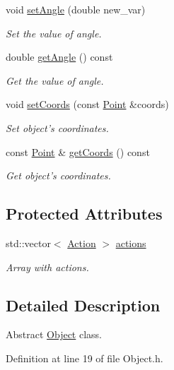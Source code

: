 \begin{DoxyCompactItemize}
void \hyperlink{classObject_a075891336e08ea144917d8468f8480f1}{set\-Angle} (double new\-\_\-var)
\begin{DoxyCompactList}\small\item\em Set the value of angle. \end{DoxyCompactList}\item 
double \hyperlink{classObject_aaba7ccef31e74246abda5ef9cb2e202c}{get\-Angle} () const 
\begin{DoxyCompactList}\small\item\em Get the value of angle. \end{DoxyCompactList}\item 
void \hyperlink{classObject_a67d41327686c2018494ea788379db9aa}{set\-Coords} (const \hyperlink{classPoint}{Point} \&coords)
\begin{DoxyCompactList}\small\item\em Set object's coordinates. \end{DoxyCompactList}\item 
const \hyperlink{classPoint}{Point} \& \hyperlink{classObject_a64bb5b1d10c6cd338a65a8dd62473de1}{get\-Coords} () const 
\begin{DoxyCompactList}\small\item\em Get object's coordinates. \end{DoxyCompactList}\end{DoxyCompactItemize}
\subsection*{Protected Attributes}
\begin{DoxyCompactItemize}
\item 
std\-::vector$<$ \hyperlink{classAction}{Action} $>$ \hyperlink{classObject_a7fa5bd0db11056aac9440fa9f6eb2690}{actions}
\begin{DoxyCompactList}\small\item\em Array with actions. \end{DoxyCompactList}\end{DoxyCompactItemize}


\subsection{Detailed Description}
Abstract \hyperlink{classObject}{Object} class. 

Definition at line 19 of file Object.\-h.



